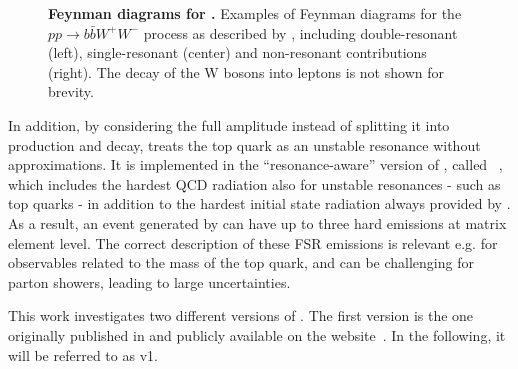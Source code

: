 \begin{figure}[t]
    \caption{\textbf{Feynman diagrams for \bbfourl.} Examples of Feynman diagrams for the $pp \to b \bar{b} W^+ W^-$ process as described by \bbfourl, including double-resonant (left), single-resonant (center) and non-resonant contributions (right). The decay of the W bosons into leptons is not shown for brevity.}
    \label{fig:bb4l:feynman}
\end{figure}

In addition, by considering the full amplitude instead of splitting it into production and decay, \bbfourl treats the top quark as an unstable resonance without approximations. It is implemented in the ``resonance-aware'' version of \powheg, called \powhegvres~\cite{Jezo:2015aia}, which includes the hardest QCD radiation also for unstable resonances - such as top quarks - in addition to the hardest initial state radiation always provided by \powheg. As a result, an event generated by \bbfourl can have up to three hard emissions at matrix element level. The correct description of these FSR emissions is relevant e.g. for observables related to the mass of the top quark, and can be challenging for parton showers, leading to large uncertainties.

This work investigates two different versions of \bbfourl. The first version is the one originally published in  and publicly available on the \powheg website~\cite{Powheg:website}. In the following, it will be referred to as \bbfourl v1.

